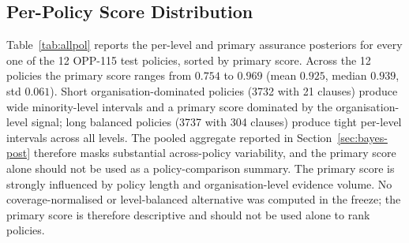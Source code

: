 \documentclass[final,3p,times,twocolumn]{elsarticle}
\begin{document}
	\subsection{Per-Policy Score Distribution}
	\label{sec:per-policy-dist} Table~\ref{tab:allpol} reports the per-level and primary
	assurance posteriors for every one of the 12 OPP-115 test policies, sorted by
	primary score. Across the 12 policies the primary score ranges from $0.754$ to
	$0.969$ (mean $0.925$, median $0.939$, std $0.061$). Short organisation-dominated
	policies (3732 with 21 clauses) produce wide minority-level intervals and a
	primary score dominated by the organisation-level signal; long balanced policies
	(3737 with 304 clauses) produce tight per-level intervals across all levels.
	The pooled aggregate reported in Section~\ref{sec:bayes-post} therefore masks
	substantial across-policy variability, and the primary score alone should not be
	used as a policy-comparison summary.
	The primary score is strongly influenced by policy length and organisation-level
	evidence volume. No coverage-normalised or level-balanced alternative was
	computed in the freeze; the primary score is therefore descriptive and should
	not be used alone to rank policies.
\end{document}
